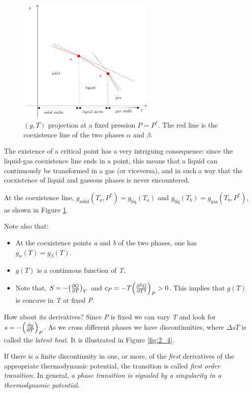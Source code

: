 \documentclass[../../Main/Main.tex]{subfiles}
\begin{document}
\begin{figure}[h!]
\centering
\includegraphics[width=0.6\textwidth]{./img/3.pdf}
\caption{\label{fig:2_3}  \( (g,T) \) projection at a fixed pression \( P = P^* \). The red line is the coexistence line of the two phases \( \alpha\) and \( \beta\).}
\end{figure}

The existence of a critical point has a very intriguing consequence: since the liquid-gas coexistence line ends in a point, this means that a liquid can continuously be transformed in a gas
(or viceversa), and in such a way that the coexistence of liquid and gaseous phases is never encountered.

At the coexistence line, \( g_{\text{solid}}(T_ a, P^*) = g_{\text{liq}}(T_a) \) and \( g_{\text{liq}}(T_b) = g_{\text{gas}}(T_b , P^*) \), as shown in Figure \ref{fig:2_3}.

Note also that:
\begin{itemize}
\item At the coexistence points \emph{a} and \emph{b} of the two phases, one has \( g_ \alpha (T) = g_ \beta (T) \).
\item \( g(T) \) is a continuous function of \emph{T}.
\item Note that, \( S= -\qty(\pdv{G}{T} )_V  \)  and \( c_P = - T \qty(\pdv[2]{G}{T})_P> 0 \). This implies that \( g(T) \) is concave in \emph{T} at fixed \emph{P}.
\end{itemize}

\noindent
How about its derivatives? Since \emph{P}  is fixed we can vary \emph{T}  and look for \( s=-\qty(\pdv{g}{T} )_P  \). As we cross different phases  we have discontinuities, where \( \Delta s T \)  is called the \emph{latent heat}. It is illustrated in Figure \ref{fig:2_4}.

If there is a finite discontinuity in one, or more, of the \emph{first} derivatives of the appropriate thermodynamic potential, the transition is called \emph{first order transition.} In general, \emph{a phase transition is signaled by a singularity in a thermodynamic potential}.
\end{document}
